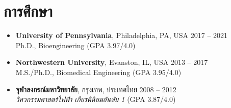 \section{\sc การศึกษา}

\begin{itemize}[leftmargin=0cm, label={}]

\item {\bf University of Pennsylvania}, Philadelphia, PA, USA \hfill 2017 -- 2021 \\
Ph.D., Bioengineering \hfill (GPA 3.97/4.0)

\item {\bf Northwestern University}, Evanston, IL, USA \hfill 2013 -- 2017 \\
M.S./Ph.D., Biomedical Engineering \hfill (GPA 3.95/4.0)

\item {\bf จุฬาลงกรณ์มหาวิทยาลัย}, กรุงเทพ, ประเทศไทย \hfill 2008 -- 2012 \\
 {\em วิศวกรรมศาสตร์ไฟฟ้า เกียรตินิยมอันดับ 1} \hfill (GPA 3.87/4.0)\\

\end{itemize}
